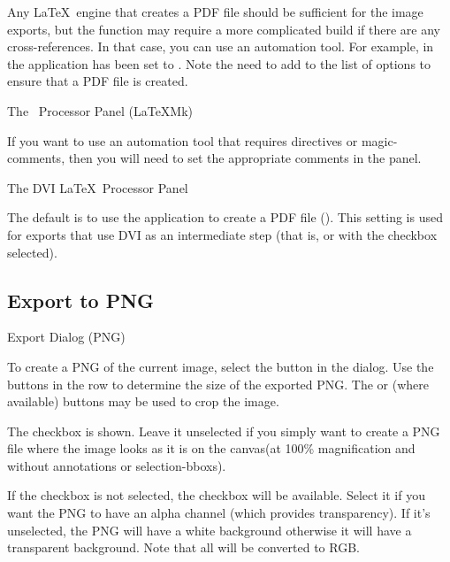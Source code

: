 Any \LaTeX\ engine that creates a PDF file should be sufficient for
the image exports, but the  function may
require a more complicated build if there are any cross-references.
In that case, you can use an automation tool. For example, in
 the application has been set to
. Note the need to add  to the list of
options to ensure that a PDF file is created.

 {}
 {The \pdfLaTeX\ Processor Panel (LaTeXMk)}

If you want to use an automation tool that requires \glspl{directive}
or \glspl{magic-comment}, then you will need to set the appropriate
comments in the 
panel.


 {}
 {The DVI \LaTeX\ Processor Panel}

The default is to use the  application to create a PDF
file ().  This setting is used for exports
that use DVI as an intermediate step (that is, 
or  with the  checkbox
selected).

\subsection{Export to PNG}\label{sec:exportpng}

 {}
 {Export Dialog (PNG)}


To create a PNG of the current image, select the 
button in the  dialog.
Use the buttons in the  row to determine the
size of the exported PNG. The 
or (where available)  buttons may be
used to crop the image.

The  checkbox is shown. Leave it
unselected if you simply want to create a PNG file where the image
looks as it is  on the \gls{canvas}(at
100\% magnification and without annotations or
\glspl{selection-bbox}).


If the  checkbox is not selected, the
 checkbox will be available. Select it if
you want the PNG to have an alpha channel (which provides
transparency). If it's unselected, the PNG will have a white
background otherwise it will have a \gls{transparent} background.
Note that all  will be converted to RGB.

